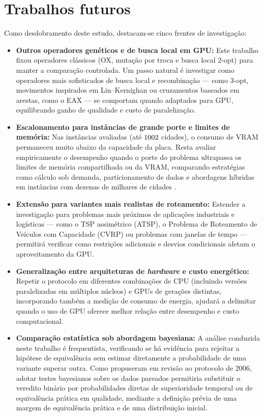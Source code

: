 \section{Trabalhos futuros}\label{sec-64-trabalhos-futuros}

Como desdobramento deste estudo, destacam-se cinco frentes de investigação:

\begin{itemize}
      \item
            \textbf{Outros operadores genéticos e de busca local em GPU:} Este trabalho fixou operadores clássicos (OX, mutação por troca e busca local \(2\)-opt) para manter a comparação controlada. Um passo natural é investigar como operadores mais sofisticados de busca local e recombinação --- como \(3\)-opt, movimentos inspirados em Lin--Kernighan ou cruzamentos baseados em arestas, como o EAX \autocite{nagata2013powerful} --- se comportam quando adaptados para GPU, equilibrando ganho de qualidade e custo de paralelização.
      \item
            \textbf{Escalonamento para instâncias de grande porte e limites de memória:} Nas instâncias avaliadas (até \(1002\) cidades), o consumo de VRAM permaneceu muito abaixo da capacidade da placa. Resta avaliar empiricamente o desempenho quando o porte do problema ultrapassa os limites de memória compartilhada ou da VRAM, comparando estratégias como cálculo sob demanda, particionamento de dados e abordagens híbridas em instâncias com dezenas de milhares de cidades \autocite{schulz2013gpu,oneil2015rethinking}.
      \item
            \textbf{Extensão para variantes mais realistas de roteamento:} Estender a investigação para problemas mais próximos de aplicações industriais e logísticas --- como o TSP assimétrico (ATSP), o Problema de Roteamento de Veículos com Capacidade (CVRP) ou problemas com janelas de tempo --- permitirá verificar como restrições adicionais e desvios condicionais afetam o aproveitamento da GPU.
      \item
            \textbf{Generalização entre arquiteturas de \emph{hardware} e custo energético:} Repetir o protocolo em diferentes combinações de CPU (incluindo versões paralelizadas em múltiplos núcleos) e GPUs de gerações distintas, incorporando também a medição de consumo de energia, ajudará a delimitar quando o uso de GPU oferece melhor relação entre desempenho e custo computacional.
      \item
            \textbf{Comparação estatística sob abordagem bayesiana:} A análise conduzida neste trabalho é frequentista, verificando se há evidência para rejeitar a hipótese de equivalência sem estimar diretamente a probabilidade de uma variante superar outra. Como propuseram \textcite{benavoli2017time} em revisão ao protocolo de 2006, adotar testes bayesianos sobre os dados pareados permitiria substituir o veredito binário por probabilidades diretas de superioridade temporal ou de equivalência prática em qualidade, mediante a definição prévia de uma margem de equivalência prática e de uma distribuição inicial.
\end{itemize}
